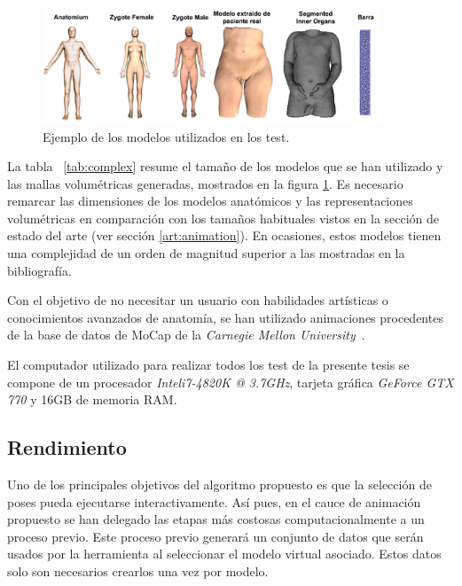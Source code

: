 \begin{figure}[h]%
  \centering
  \includegraphics[width=0.90\textwidth]{IMG/modelos}
    \caption{Ejemplo de los modelos utilizados en los test.}
    \label{fig:models}
\end{figure}

La tabla ~\ref{tab:complex} resume el tamaño de los modelos que se han utilizado y las mallas volumétricas generadas, mostrados en la figura \ref{fig:models}. Es necesario remarcar las dimensiones de los modelos anatómicos y las representaciones volumétricas en comparación con los tamaños habituales vistos en la sección de estado del arte (ver sección \ref{art:animation}). En ocasiones, estos modelos tienen una complejidad de un orden de magnitud superior a las mostradas en la bibliografía.

Con el objetivo de no necesitar un usuario con habilidades artísticas o conocimientos avanzados de anatomía, se han utilizado animaciones procedentes de la base de datos de \ac{MoCap} de la \emph{Carnegie Mellon University}~\cite{CMUMCD}.

El computador utilizado para realizar todos los test de la presente tesis se compone de un procesador \emph{Intel\textregistered i7-4820K @ 3.7GHz}, tarjeta gráfica \emph{GeForce GTX 770} y 16GB de memoria \acs{RAM}.


\subsection{Rendimiento}

Uno de los principales objetivos del algoritmo propuesto es que la selección de poses pueda ejecutarse interactivamente. Así pues, en el cauce de animación propuesto se han delegado las etapas más costosas computacionalmente a un proceso previo. Este proceso previo generará un conjunto de datos que serán usados por la herramienta al seleccionar el modelo virtual asociado. Estos datos solo son necesarios crearlos una vez por modelo.  


